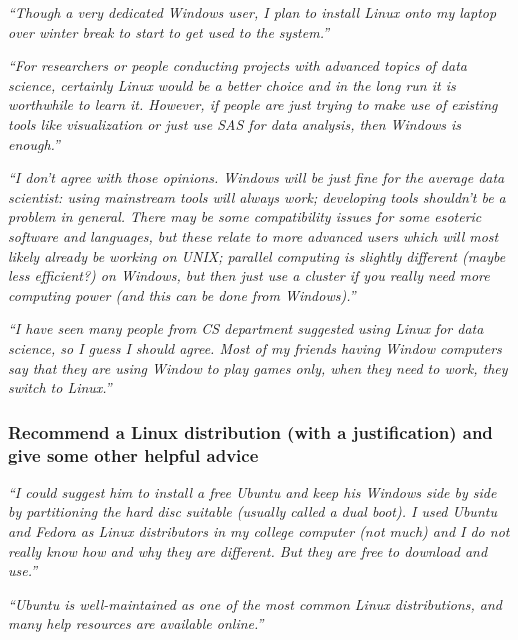 \documentclass[12pt]{beamer}
\newcommand\ans[1]{{\it ``#1''}}
\newcommand\gap{\vspace{5mm}}
\begin{document}
\begin{frame}
  \ans{Though a very dedicated Windows user, I plan to install Linux onto my laptop over winter break to start to get used to the system.}
  
  \end{frame}

\begin{frame}
\ans{For  researchers  or  people  conducting  projects  with  advanced  topics  of  data  science, certainly Linux would be a better choice and in the long run it is worthwhile to learn it.  However, if people are just trying to make use of existing tools like visualization or just use SAS for data analysis, then Windows is enough.}
\end{frame}

\begin{frame}
  \ans{I  don’t  agree  with  those  opinions.   Windows  will  be  just  fine  for  the  average  data scientist:  using  mainstream  tools  will  always  work;  developing  tools  shouldn’t  be  a problem in general.  There may be some compatibility issues for some esoteric software and languages, but these relate to more advanced users which will most likely already be working on UNIX; parallel computing is slightly different (maybe less efficient?)  on Windows, but then just use a cluster if you really need more computing power (and this can be done from Windows).}
  
  \end{frame}

\begin{frame}
  \ans{I have seen many people from CS department suggested using Linux for data science, so I guess I should agree.  Most of my friends having Window computers say that they are using Window to play games only, when they need to work, they switch to Linux.}
  \end{frame}

\begin{frame} %
  
\frametitle{Recommend a Linux distribution (with a justification) and give some other helpful advice}  

\ans{I  could  suggest  him  to  install  a  free  Ubuntu  and  keep  his  Windows  side  by  side  by partitioning the hard disc suitable (usually called a dual boot).  I used Ubuntu and Fedora as Linux distributors in my college computer (not much) and I do not really know how and why they are different.  But they are free to download and use.}

\gap

\ans{Ubuntu is well-maintained as one of the most common Linux distributions, and many help resources are available online.}

\end{frame}
\end{document}
